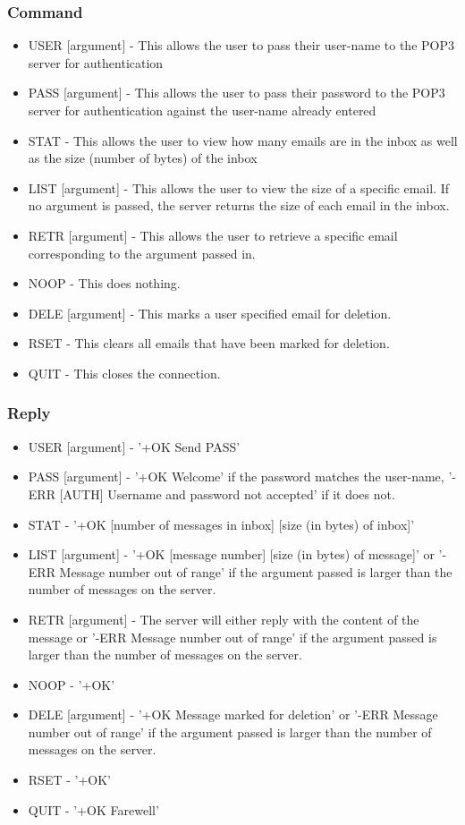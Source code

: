 \documentclass[11pt]{article}
\begin{document}
\begin{multicols}{2}
\subsubsection{Command}
\begin{itemize}
  \item USER [argument] - This allows the user to pass their user-name to the POP3 server for authentication
  \item PASS [argument] - This allows the user to pass their password to the POP3 server for authentication against the user-name already entered
  \item STAT - This allows the user to view how many emails are in the inbox as well as the size (number of bytes) of the inbox
  \item LIST [argument] - This allows the user to view the size of a specific email. If no argument is passed, the server returns the size of each email in the inbox.
  \item RETR [argument] - This allows the user to retrieve a specific email corresponding to the argument passed in.
  \item NOOP - This does nothing.
  \item DELE [argument] - This marks a user specified email for deletion.
  \item RSET - This clears all emails that have been marked for deletion.
  \item QUIT - This closes the connection.
\end{itemize}
\subsubsection{Reply}
\begin{itemize}
  \item USER [argument] - '+OK Send PASS'
  \item PASS [argument] - '+OK Welcome' if the password matches the user-name, '-ERR [AUTH] Username and password not accepted' if it does not.
  \item STAT - '+OK [number of messages in inbox] [size (in bytes) of inbox]'
  \item LIST [argument] - '+OK [message number] [size (in bytes) of message]' or '-ERR Message number out of range' if the argument passed is larger than the number of messages on the server.
  \item RETR [argument] - The server will either reply with the content of the message or '-ERR Message number out of range' if the argument passed is larger than the number of messages on the server.
  \item NOOP - '+OK'
  \item DELE [argument] - '+OK Message marked for deletion' or '-ERR Message number out of range' if the argument passed is larger than the number of messages on the server.
  \item RSET - '+OK'
  \item QUIT - '+OK Farewell'
\end{itemize}


\end{multicols}
\end{document}
